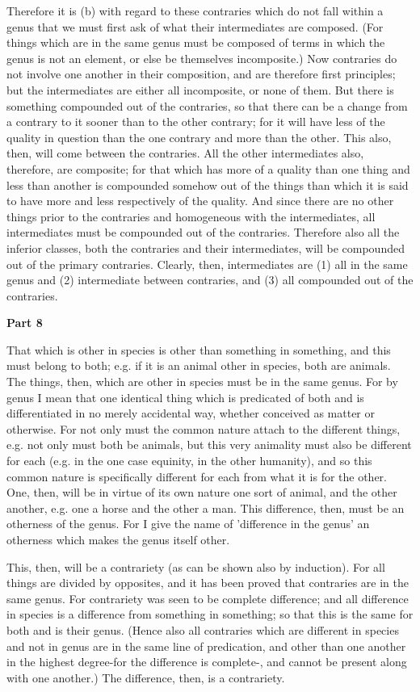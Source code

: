 Therefore it is (b) with regard to these contraries which do not fall within a genus that we must first ask of what their intermediates are composed. (For things which are in the same genus must be composed of terms in which the genus is not an element, or else be themselves incomposite.) Now contraries do not involve one another in their composition, and are therefore first principles; but the intermediates are either all incomposite, or none of them. But there is something compounded out of the contraries, so that there can be a change from a contrary to it sooner than to the other contrary; for it will have less of the quality in question than the one contrary and more than the other. This also, then, will come between the contraries. All the other intermediates also, therefore, are composite; for that which has more of a quality than one thing and less than another is compounded somehow out of the things than which it is said to have more and less respectively of the quality. And since there are no other things prior to the contraries and homogeneous with the intermediates, all intermediates must be compounded out of the contraries. Therefore also all the inferior classes, both the contraries and their intermediates, will be compounded out of the primary contraries. Clearly, then, intermediates are (1) all in the same genus and (2) intermediate between contraries, and (3) all compounded out of the contraries.

\textbf{Part 8}

That which is other in species is other than something in something, and this must belong to both; e.g. if it is an animal other in species, both are animals. The things, then, which are other in species must be in the same genus. For by genus I mean that one identical thing which is predicated of both and is differentiated in no merely accidental way, whether conceived as matter or otherwise. For not only must the common nature attach to the different things, e.g. not only must both be animals, but this very animality must also be different for each (e.g. in the one case equinity, in the other humanity), and so this common nature is specifically different for each from what it is for the other. One, then, will be in virtue of its own nature one sort of animal, and the other another, e.g. one a horse and the other a man. This difference, then, must be an otherness of the genus. For I give the name of 'difference in the genus' an otherness which makes the genus itself other.

This, then, will be a contrariety (as can be shown also by induction). For all things are divided by opposites, and it has been proved that contraries are in the same genus. For contrariety was seen to be complete difference; and all difference in species is a difference from something in something; so that this is the same for both and is their genus. (Hence also all contraries which are different in species and not in genus are in the same line of predication, and other than one another in the highest degree-for the difference is complete-, and cannot be present along with one another.) The difference, then, is a contrariety.

